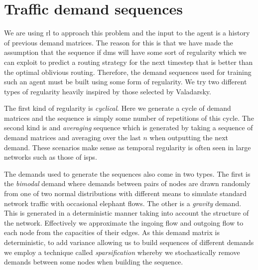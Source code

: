 \section{Traffic demand sequences}
\label{section:demands}
We are using \ac{rl} to approach this problem and the input to the agent is a history of previous demand matrices. The reason for this is that we have made the assumption that the sequence if \acp{dm} will have some sort of regularity which we can exploit to predict a routing strategy for the next timestep that is better than the optimal oblivious routing. Therefore, the demand sequences used for training such an agent must be built using some form of regularity. We try two different types of regularity heavily inspired by those selected by Valadarsky\cite{valadarsky2017learning}.

The first kind of regularity is \emph{cyclical}. Here we generate a cycle of demand matrices and the sequence is simply some number of repetitions of this cycle. The second kind is and \emph{averaging} sequence which is generated by taking a sequence of demand matrices and averaging over the last $n$ when outputting the next demand. These scenarios make sense as temporal regularity is often seen in large networks such as those of \acp{isp}\cite{fortz2002optimizing}.

The demands used to generate the sequences also come in two types. The first is the \emph{bimodal}\cite{medina2002traffic} demand where demands between pairs of nodes are drawn randomly from one of two normal distributions with different means to simulate standard network traffic with occasional elephant flows. The other is a \emph{gravity} demand\cite{roughan2002experience}. This is generated in a deterministic manner taking into account the structure of the network. Effectively we approximate the ingoing flow and outgoing flow to each node from the capacities of their edges. As this demand matrix is deterministic, to add variance allowing us to build sequences of different demands we employ a technique called \emph{sparsification} whereby we stochastically remove demands between some nodes when building the sequence.

